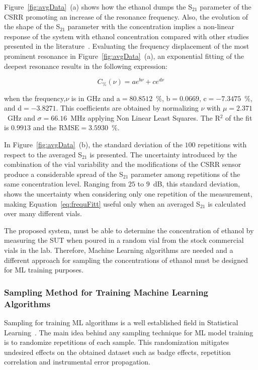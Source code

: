 \documentclass[journal,twoside,web]{ieeecolor}
\begin{document}
Figure~\ref{fig:avgData}~(a) shows how the ethanol dumps the S$_{21}$ parameter of the CSRR promoting an increase of the resonance frequency. Also, the evolution of the shape of the S$_{21}$ parameter with the concentration implies a non-linear response of the system with ethanol concentration compared with other studies presented in the literature~\cite{Abdolrazzaghi2023}. Evaluating the frequency displacement of the most prominent resonance in Figure~\ref{fig:avgData}~(a), an exponential fitting of the deepest resonance results in the following expression:

\begin{equation}
	\label{eq:frequFitt}
	 C_{\%}(\nu) = ae^{b\nu}+ce^{d\nu} 
\end{equation} 

when the frequency,$\nu$ is in GHz and a$=80.8512$~$\%$, b$=0.0669$, c$=-7.3475$~$\%$, and d$=-3.8271$. This coefficients are obtained by normalizing $\nu$ with $\mu=2.371$~GHz and $\sigma=66.16$~MHz applying Non Linear Least Squares. The R$^{2}$ of the fit is $0.9913$ and the RMSE$=3.5930$~$\%$. 
  
In Figure~\ref{fig:avgData}~(b), the standard deviation of the $100$ repetitions with respect to the averaged S$_{21}$ is presented. The uncertainty introduced by the combination of the vial variability and the modifications of the CSRR sensor produce a considerable spread of the S$_{21}$ parameter among repetitions of the same concentration level. Ranging from $25$ to $9$~dB, this standard deviation, shows the uncertainty when considering only one repetition of the measurement, making Equation~\ref{eq:frequFitt} useful only when an averaged S$_{21}$ is calculated over many different vials.

The proposed system, must be able to determine the concentration of ethanol by measuring the SUT when poured in a random vial from the stock commercial vials in the lab. Therefore, Machine Learning algorithms are needed and a different approach for sampling the concentrations of ethanol must be designed for ML training purposes.
\\
\subsubsection{Sampling Method for Training Machine Learning Algorithms}
\label{sssec:samplingML}

Sampling for training ML algorithms is a well established field in Statistical Learning~\cite{Wu2020}. The main idea behind any sampling technique for ML model training is to randomize repetitions of each sample. This randomization mitigates undesired effects on the obtained dataset such as badge effects, repetition correlation and instrumental error propagation. 
\end{document}
